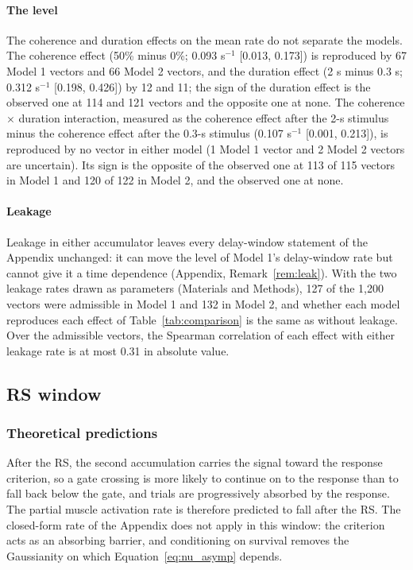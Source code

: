 \documentclass[a4paper,11pt]{article}
\theoremstyle{definition}
\newcommand{\1}{\mathbbm{1}}
\begin{document}
\paragraph{The level}

The coherence and duration effects on the mean rate do not separate the models. The coherence effect (50\% minus 0\%; 0.093 s$^{-1}$ [0.013, 0.173]) is reproduced by 67 Model 1 vectors and 66 Model 2 vectors, and the duration effect (2 s minus 0.3 s; 0.312 s$^{-1}$ [0.198, 0.426]) by 12 and 11; the sign of the duration effect is the observed one at 114 and 121 vectors and the opposite one at none. The coherence $\times$ duration interaction, measured as the coherence effect after the 2-s stimulus minus the coherence effect after the 0.3-s stimulus (0.107 s$^{-1}$ [0.001, 0.213]), is reproduced by no vector in either model (1 Model 1 vector and 2 Model 2 vectors are uncertain). Its sign is the opposite of the observed one at 113 of 115 vectors in Model 1 and 120 of 122 in Model 2, and the observed one at none.

\paragraph{Leakage}

Leakage in either accumulator leaves every delay-window statement of the Appendix unchanged: it can move the level of Model 1's delay-window rate but cannot give it a time dependence (Appendix, Remark~\ref{rem:leak}). With the two leakage rates drawn as parameters (Materials and Methods), 127 of the 1,200 vectors were admissible in Model 1 and 132 in Model 2, and whether each model reproduces each effect of Table~\ref{tab:comparison} is the same as without leakage. Over the admissible vectors, the Spearman correlation of each effect with either leakage rate is at most 0.31 in absolute value.


\subsection{RS window}


\subsubsection{Theoretical predictions}

After the RS, the second accumulation carries the signal toward the response criterion, so a gate crossing is more likely to continue on to the response than to fall back below the gate, and trials are progressively absorbed by the response. The partial muscle activation rate is therefore predicted to fall after the RS. The closed-form rate of the Appendix does not apply in this window: the criterion acts as an absorbing barrier, and conditioning on survival removes the Gaussianity on which Equation~\eqref{eq:nu_asymp} depends.
\end{document}
